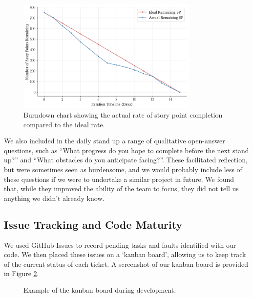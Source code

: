 \begin{figure}[h!]
	\centering
	\includegraphics[width=0.8\textwidth]{images/plot_story_points}
	\caption{Burndown chart showing the actual rate of story point completion compared to the ideal rate.}
	\label{fig:plot_story_points}
\end{figure}

We also included in the daily stand up a range of qualitative open-answer questions, such as “What progress do you hope to complete before the next stand up?” and “What obstacles do you anticipate facing?”. These facilitated reflection, but were sometimes seen as burdensome, and we would probably include less of these questions if we were to undertake a similar project in future. We found that, while they improved the ability of the team to focus, they did not tell us anything we didn’t already know.

\subsection{Issue Tracking and Code Maturity}
\label{sec:issuetracking}
We used GitHub Issues to record pending tasks and faults identified with our code. We then placed these issues on a `kanban board’, allowing us to keep track of the current status of each ticket. A screenshot of our kanban board is provided in Figure \ref{fig:kanban_board}.

\begin{figure}[h!]
	\caption{Example of the kanban board during development.}
	\label{fig:kanban_board}
\end{figure}

